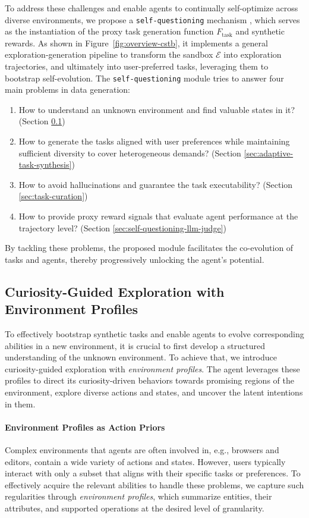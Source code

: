 To address these challenges and enable agents to continually self-optimize across diverse environments, we propose a \texttt{self-questioning} mechanism
, which serves as the instantiation of the proxy task generation function $F_{\mathrm{task}}$ and synthetic rewards. As shown in Figure~\ref{fig:overview-cstb}, it implements a general exploration-generation pipeline to transform the sandbox $\mathcal E$ into exploration trajectories, and ultimately into user-preferred tasks, leveraging them to bootstrap self-evolution. The \texttt{self-questioning} module tries to answer four main problems in data generation:
\begin{enumerate}
    \item How to understand an unknown environment and find valuable states in it?  (Section \ref{sec:exploration-with-profiles})
    \item How to generate the tasks aligned with user preferences while maintaining sufficient diversity to cover heterogeneous demands? (Section \ref{sec:adaptive-task-synthesis})
    \item How to avoid hallucinations and guarantee the task executability? (Section \ref{sec:task-curation})
    \item How to provide proxy reward signals that evaluate agent performance at the trajectory level? (Section \ref{sec:self-questioning-llm-judge})
\end{enumerate}
By tackling these problems, the proposed module facilitates the co-evolution of tasks and agents, thereby progressively unlocking the agent's potential.

\subsection{Curiosity-Guided Exploration with Environment Profiles} \label{sec:exploration-with-profiles}

To effectively bootstrap synthetic tasks and enable agents to evolve corresponding abilities in a new environment, it is crucial to first develop a structured understanding of the unknown environment. To achieve that, we introduce curiosity-guided exploration with \textit{environment profiles}. The agent leverages these profiles to direct its curiosity-driven behaviors towards promising regions of the environment, explore diverse actions and states, and uncover the latent intentions in them.


\paragraph{Environment Profiles as Action Priors} 
Complex environments that agents are often involved in, e.g., browsers and editors, contain a wide variety of actions and states. However, users typically interact with only a subset that aligns with their specific tasks or preferences. To effectively acquire the relevant abilities to handle these problems, we capture such regularities through \textit{environment profiles}, which summarize entities, their attributes, and supported operations at the desired level of granularity.



